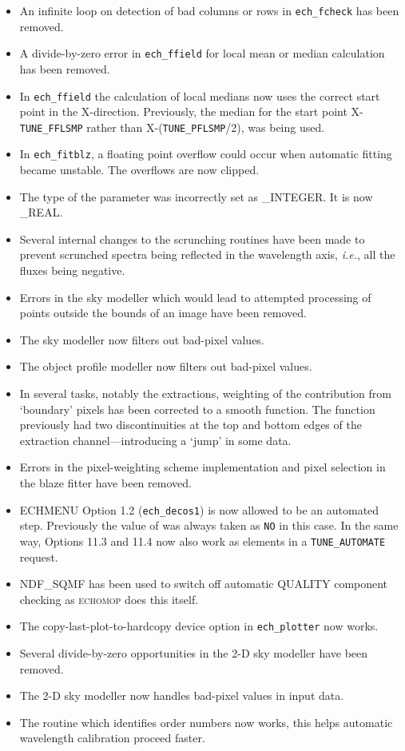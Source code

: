 \documentclass[twoside,11pt,nolof]{starlink}
\newcommand{\sunspec}[2]{#2}
\begin{document}
\begin{itemize}
\item An infinite loop on detection of bad columns or rows in {\tt ech\_fcheck}
   has been removed.
\item A divide-by-zero error in {\tt ech\_ffield} for local mean or median
   calculation has been removed.
\item In {\tt ech\_ffield} the calculation of local medians now uses the correct
   start point in the X-direction.  Previously, the median for the start
   point X\sunspec{$-$}{-}{\tt{TUNE\_FFLSMP}} rather than
   X\sunspec{$-$}{-}({\tt{TUNE\_PFLSMP}}/2), was being used.
\item In {\tt ech\_fitblz}, a floating point overflow could occur when automatic
   fitting became unstable.  The overflows are now clipped.
\item The type of the parameter
    was incorrectly set as
   \_INTEGER.  It is now \_REAL.
\item Several internal changes to the scrunching routines have been made to
   prevent scrunched spectra being reflected in the wavelength axis,
   {\textit{i.e.}}, all the fluxes being negative.
\item Errors in the sky modeller which would lead to attempted processing
   of points outside the bounds of an image have been removed.
\item The sky modeller now filters out bad-pixel values.
\item The object profile modeller now filters out bad-pixel values.
\item In several tasks, notably the extractions, weighting of the
   contribution from `boundary' pixels has been corrected to a smooth
   function.  The function previously had two discontinuities at the top
   and bottom edges of the extraction channel---introducing a `jump' in
   some data.
\item Errors in the pixel-weighting scheme implementation and pixel
   selection in the blaze fitter have been removed.
\item ECHMENU Option 1.2 ({\tt{ech\_decos1}}) is now allowed to be an automated
   step. Previously the value of 
   was always taken as \texttt{NO} in
   this case.  In the same way, Options 11.3 and 11.4 now also work as
   elements in a {\tt TUNE\_AUTOMATE} request.
\item NDF\_SQMF has been used to switch off automatic QUALITY component
   checking as \textsc{echomop} does this itself.
\item The copy-last-plot-to-hardcopy device option in {\tt ech\_plotter}
   now works.
\item Several divide-by-zero opportunities in the 2-D sky modeller have been
   removed.
\item The 2-D sky modeller now handles bad-pixel values in input data.
\item The routine which identifies order numbers now works, this helps
   automatic wavelength calibration proceed faster.
\end{itemize}



\printindex


\end{document}
